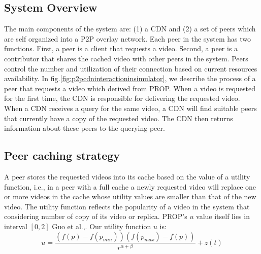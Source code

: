 \documentclass[10pt,final,journal,a4paper]{IEEEtran}
\begin{document}
\subsection{System Overview}\label{systemoverview}
The main components of the system are: (1) a CDN and (2) a set of peers which are self organized into a P2P overlay network.
Each peer in the system has two functions.
First, a peer is a client that requests a video. 
Second, a peer is a contributor that shares the cached video with other peers in the system. 
Peers control the number and utilization of their connection based on current resources availability.
In fig.\ref{fig:p2pcdninteractioninsimulator}, we describe the process of a peer that requests a video which derived from PROP.
When a video is requested for the first time, the CDN is responsible for delivering the requested video.
When a CDN receives a query for the same video, a CDN will find suitable peers that currently have a copy of the requested video.
The CDN then returns information about these peers to the querying peer.





\subsection{Peer caching strategy}\label{peercachingstrategy}

A peer stores the requested videos into its cache based on the value of a utility function, i.e., in a peer with a full cache a newly requested video will replace one or more videos in the cache whose utility values are smaller than that of the new video.
The utility function reflects the popularity of a video in the system that considering number of copy of its video or replica. 
PROP's $u$ value itself lies in interval $[0,2]$ Guo et al.,\cite{1613869}.
Our utility function $u$ is:
\begin{equation}
u = \frac{ (f(p) - f(p_{min})) (f(p_{max}) - f(p)) }{r^{\alpha + \beta}} + z(t)
\end{equation}
\end{document}
